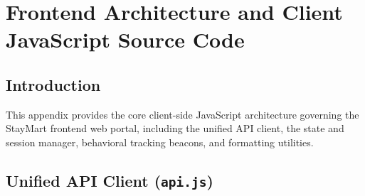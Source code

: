\chapter{Frontend Architecture and Client JavaScript Source Code}

\section{Introduction}
This appendix provides the core client-side JavaScript architecture governing the StayMart frontend web portal, including the unified API client, the state and session manager, behavioral tracking beacons, and formatting utilities.

\section{Unified API Client (\texttt{api.js})}
